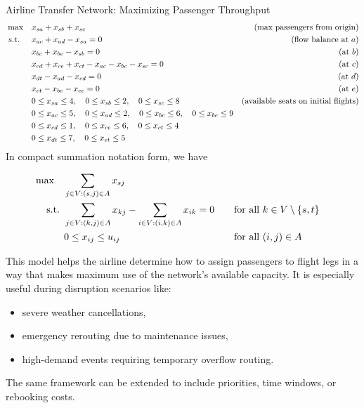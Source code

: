 \begin{examplewithallcode}{Airline Transfer Network: Maximizing Passenger Throughput}
\smallskip {}
\begin{align*}
\max \quad & x_{sa} + x_{sb} + x_{sc} & \mbox{(max passengers from origin)} \\
\mbox{ s.t. } \quad 
& x_{ac} + x_{ad} - x_{sa} = 0 & \mbox{(flow balance at \( a \))} \\
& x_{bc} + x_{be} - x_{sb} = 0 & \mbox{(at \( b \))} \\
& x_{cd} + x_{ce} + x_{ct} - x_{ac} - x_{bc} - x_{sc} = 0 & \mbox{(at \( c \))} \\
& x_{dt} - x_{ad} - x_{cd} = 0 & \mbox{(at \( d \))} \\
& x_{et} - x_{be} - x_{ce} = 0 & \mbox{(at \( e \))} \\
& 0 \leq x_{sa} \leq 4,\quad 0 \leq x_{sb} \leq 2,\quad 0 \leq x_{sc} \leq 8 & \mbox{(available seats on initial flights)} \\
& 0 \leq x_{ac} \leq 5,\quad 0 \leq x_{ad} \leq 2,\quad 0 \leq x_{bc} \leq 6,\quad 0 \leq x_{be} \leq 9 \\
& 0 \leq x_{cd} \leq 1,\quad 0 \leq x_{ce} \leq 6,\quad 0 \leq x_{ct} \leq 4 \\
& 0 \leq x_{dt} \leq 7,\quad 0 \leq x_{et} \leq 5
\end{align*}
In compact summation notation form,  we have

$$
\begin{aligned}
\max \quad & \sum_{j \in V : (s,j) \in A} x_{sj} \\
\mbox{ s.t. }        & \sum_{j \in V : (k,j) \in A} x_{kj} - \sum_{i \in V : (i,k) \in A} x_{ik} = 0 &&\quad \mbox{for all } k \in V \setminus \{s,t\} \\
           & 0 \leq x_{ij} \leq u_{ij} &&\quad \mbox{for all } (i,j) \in A
\end{aligned}
$$

\vspace{0.5em}
\noindent This model helps the airline determine how to assign passengers to flight legs in a way that makes maximum use of the network’s available capacity. It is especially useful during disruption scenarios like:
\begin{itemize}
    \item severe weather cancellations,
    \item emergency rerouting due to maintenance issues,
    \item high-demand events requiring temporary overflow routing.
\end{itemize}

The same framework can be extended to include priorities, time windows, or rebooking costs.
\end{examplewithallcode}

